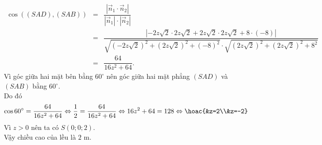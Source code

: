 \begin{ex}
{\begin{eqnarray*}
			\cos((SAD),(SAB))&=&\dfrac{|\overrightarrow{n}_1\cdot \overrightarrow{n}_2|}{|\overrightarrow{n}_1|\cdot |\overrightarrow{n}_2|}\\
			&=&\dfrac{|-2z\sqrt{2}\cdot 2z\sqrt{2}+2z\sqrt{2}\cdot 2z\sqrt{2}+8\cdot(-8)|}{\sqrt{(-2z\sqrt{2})^2+(2z\sqrt{2})^2+(-8)^2}\cdot \sqrt{(2z\sqrt{2})^2+(2z\sqrt{2})^2+8^2}}\\
			&=&\dfrac{64}{16z^2+64}.
		\end{eqnarray*}
		Vì góc giữa hai mặt bên bằng $60^{\circ}$ nên góc giữa hai mặt phẳng $(SAD)$ và $(SAB)$ bằng $60^{\circ}$.\\
		Do đó
		$$\cos 60^{\circ}=\dfrac{64}{16z^2+64} \Leftrightarrow \dfrac{1}{2}=\dfrac{64}{16z^2+64}\Leftrightarrow 16z^2+64=128\Leftrightarrow \hoac{&z=2\\&z=-2}$$
		Vì $z>0$ nên ta có $S(0;0;2)$.\\
		Vậy chiều cao của lều là $2$ m.
	}
\end{ex}

